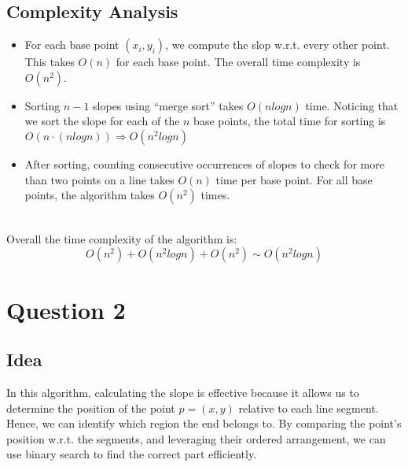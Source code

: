 \documentclass{article}
\begin{document}
\subsection*{Complexity Analysis}
\begin{itemize}
    \item For each base point $(x_i, y_i)$, we compute the slop w.r.t. every other point. This takes $O(n)$ for each base point. The overall time complexity is $O(n^2)$.
    \item Sorting $n - 1$ slopes using ``merge sort'' takes $O(nlogn)$ time. Noticing that we sort the slope for each of the $n$ base points, the total time for sorting is $O(n \cdot (nlogn)) \Rightarrow O(n^2 logn)$
    \item After sorting, counting consecutive occurrences of slopes to check for more than two points on a line takes $O(n)$ time per base point. For all base points, the algorithm takes $O(n^2)$ times.
\end{itemize}
\\
Overall the time complexity of the algorithm is:
\[ O(n^2) + O(n^2logn) + O(n^2) \sim O(n^2logn) \]

\section*{Question 2}

\subsection*{Idea}
In this algorithm, calculating the slope is effective because it allows us to determine the position of the point $p = (x,y)$ relative to each line segment. Hence, we can identify which region the end belongs to. By comparing the point's position w.r.t. the segments, and leveraging their ordered arrangement, we can use binary search to find the correct part efficiently.
\end{document}
